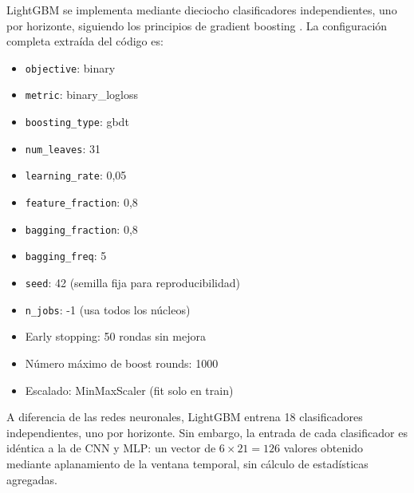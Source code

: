 LightGBM se implementa mediante dieciocho clasificadores independientes, uno por horizonte, siguiendo los principios de gradient boosting \cite{friedman2001greedy, ke2017lightgbm}. La configuración completa extraída del código es:

\begin{itemize}
    \item \texttt{objective}: binary
    \item \texttt{metric}: binary\_logloss
    \item \texttt{boosting\_type}: gbdt
    \item \texttt{num\_leaves}: 31
    \item \texttt{learning\_rate}: 0,05
    \item \texttt{feature\_fraction}: 0,8
    \item \texttt{bagging\_fraction}: 0,8
    \item \texttt{bagging\_freq}: 5
    \item \texttt{seed}: 42 (semilla fija para reproducibilidad)
    \item \texttt{n\_jobs}: -1 (usa todos los núcleos)
    \item Early stopping: 50 rondas sin mejora
    \item Número máximo de boost rounds: 1000
    \item Escalado: MinMaxScaler (fit solo en train)
\end{itemize}

A diferencia de las redes neuronales, LightGBM entrena 18 clasificadores independientes, uno por horizonte. Sin embargo, la entrada de cada clasificador es idéntica a la de CNN y MLP: un vector de $6 \times 21 = 126$ valores obtenido mediante aplanamiento de la ventana temporal, sin cálculo de estadísticas agregadas.\\

